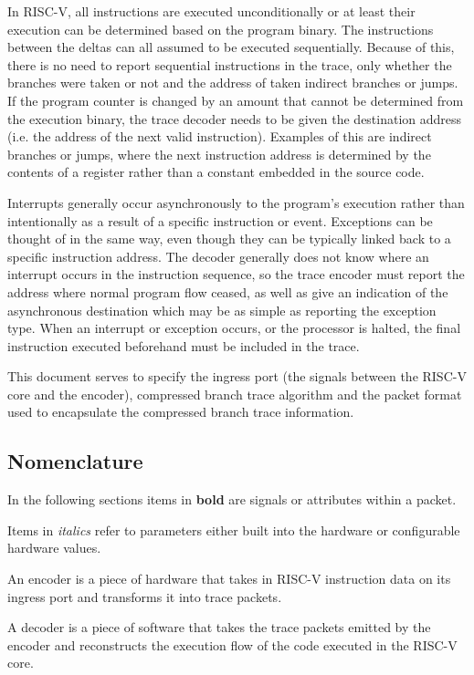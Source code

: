 In RISC-V, all instructions are executed unconditionally or at least
their execution can be determined based on the program binary. The
instructions between the deltas can all assumed to be executed
sequentially. Because of this, there is no need to report sequential 
instructions in the trace, only whether the branches were taken or not
and the address of taken indirect branches or jumps. If the program
counter is changed by an amount that cannot be determined from the
execution binary, the trace decoder needs to be given the destination
address (i.e. the address of the next valid instruction).  Examples of
this are indirect branches or jumps, where the next instruction
address is determined by the contents of a register rather than a
constant embedded in the source code.

Interrupts generally occur asynchronously to the program's execution
rather than intentionally as a result of a specific instruction or
event.  Exceptions can be thought of in the same way, even though they
can be typically linked back to a specific instruction address.  The
decoder generally does not know where an interrupt occurs in the
instruction sequence, so the trace encoder must report the address
where normal program flow ceased, as well as give an indication of the
asynchronous destination which may be as simple as reporting the
exception type.  When an interrupt or exception occurs, or the
processor is halted, the final instruction executed beforehand must be
included in the trace.

This document serves to specify the ingress port (the signals between
the RISC-V core and the encoder), compressed branch trace algorithm and
the packet format used to encapsulate the compressed branch trace
information.

\subsection{Nomenclature}

In the following sections items in \textbf{bold} are signals or
attributes within a packet.

Items in \textit {italics} refer to parameters either built into the
hardware or configurable hardware values.

An encoder is a piece of hardware that takes in RISC-V instruction data
on its ingress port and transforms it into trace packets.

A decoder is a piece of software that takes the trace packets emitted by the
encoder and reconstructs the execution flow of the code executed in the RISC-V core.

